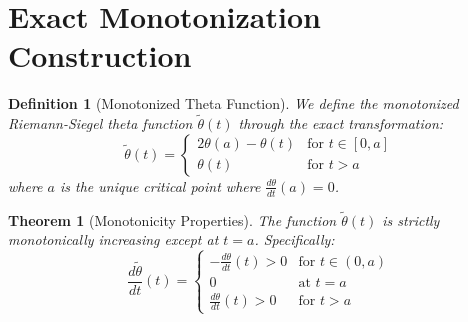 \documentclass{article}
\newtheorem{definition}{Definition}
\newtheorem{theorem}{Theorem}
\begin{document}
\section{Exact Monotonization Construction}

\begin{definition}[Monotonized Theta Function]
  We define the monotonized Riemann-Siegel theta function $\tilde{\theta} (t)$
  through the exact transformation:
  \begin{equation}
    \tilde{\theta} (t) = \left\{ \begin{array}{ll}
      2 \theta (a) - \theta (t) & \text{for } t \in [0, a]\\
      \theta (t) & \text{for } t > a
    \end{array} \right.
  \end{equation}
  where $a$ is the unique critical point where $\frac{d \theta}{dt} (a) = 0$.
\end{definition}

\begin{theorem}[Monotonicity Properties]
  The function $\tilde{\theta} (t)$ is strictly monotonically increasing
  except at $t = a$. Specifically:
  \begin{equation}
    \frac{d \tilde{\theta}}{dt} (t) = \left\{ \begin{array}{ll}
      - \frac{d \theta}{dt} (t) > 0 & \text{for } t \in (0, a)\\
      0 & \text{at } t = a\\
      \frac{d \theta}{dt} (t) > 0 & \text{for } t > a
    \end{array} \right.
  \end{equation}
\end{theorem}
\end{document}
